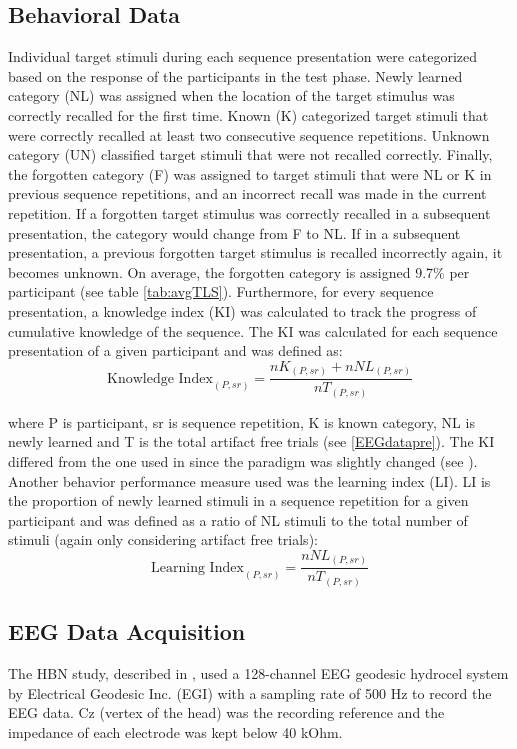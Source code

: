 \subsection{Behavioral Data}
Individual target stimuli during each sequence presentation were categorized based on the response of the participants in the test phase. 
Newly learned category (NL) was assigned when the location of the target stimulus was correctly recalled for the first time. Known (K) categorized target stimuli that were correctly recalled at least two consecutive sequence repetitions. Unknown category (UN) classified target stimuli that were not recalled correctly. Finally, the forgotten category (F) was assigned to target stimuli that were NL or K in previous sequence repetitions, and an incorrect recall was made in the current repetition. If a forgotten target stimulus was correctly recalled in a subsequent presentation, the category would change from F to NL. If in a subsequent presentation, a previous forgotten target stimulus is recalled incorrectly again, it becomes unknown. On average, the forgotten category is assigned 9.7\% per participant (see table \ref{tab:avgTLS}).
Furthermore, for every sequence presentation, a knowledge index (KI) was calculated to track the progress of cumulative knowledge of the sequence. The KI was calculated for each sequence presentation of a given participant and was defined as: 
\begin{equation}\label{eq:KI}
    \textrm{Knowledge Index}_{(P,sr)} = \frac{nK_{(P,sr)}+nNL_{(P,sr)}}{nT_{(P,sr)}}
\end{equation}


where P is participant, sr is sequence repetition, K is known category, NL is newly learned and T is the total artifact free trials (see \ref{EEGdatapre}). The KI differed from the one used in \textcite{steinemannTrackingNeuralCorrelates2016} since the paradigm was slightly changed (see ).
Another behavior performance measure used was the learning index (LI). LI is the proportion of newly learned stimuli in a sequence repetition for a given participant and was defined as a ratio of NL stimuli to the total number of stimuli (again only considering artifact free trials): 
\begin{equation} \label{eq:LI}
    \textrm{Learning Index}_{(P,sr)} = \frac{nNL_{(P,sr)}}{nT_{(P,sr)}}
\end{equation}


\subsection{EEG Data Acquisition}
The HBN study, described in \textcite{alexanderOpenResourceTransdiagnostic2017}, used a 128-channel EEG geodesic hydrocel system by Electrical Geodesic Inc. (EGI) with a sampling rate of 500 Hz to record the EEG data. Cz (vertex of the head) was the recording reference and the impedance of each electrode was kept below 40 kOhm. 

